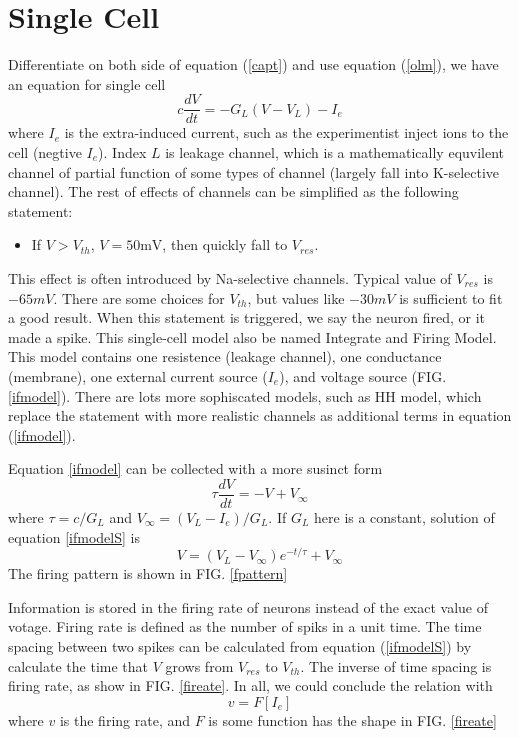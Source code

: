 \documentclass[11pt]{article}
\begin{document}
\section{Single Cell}

Differentiate on both side of equation (\ref{capt}) and use equation ({\ref{olm}}), we
have an equation for single cell
\begin{equation}
  c \frac{dV}{dt} = - G_L (V - V_L) - I_e
  \label{ifmodel}
\end{equation}
where $I_e$ is the extra-induced current, such as the experimentist inject ions
to the cell (negtive $I_e$). Index $L$ is leakage channel, which is a
mathematically equvilent
channel of partial function of some types of channel (largely fall into K-selective channel). The rest of effects of channels can
be simplified as the following statement:
\begin{itemize}
\item{} If $V > V_{th}$, $V = 50 \text{mV}$, then quickly fall to $V_{res}$.
  \label{ifstate}
\end{itemize}
This effect is often introduced by Na-selective channels. Typical value of
$V_{res}$ is $-65 mV$. There are some choices for $V_{th}$, but values like $-30
mV$ is sufficient to fit a good result. When this statement is triggered, we say
the neuron fired, or it made a spike. This single-cell model also be named
Integrate and Firing Model. This model contains one resistence (leakage
channel), one conductance (membrane),
one external current source ($I_e$), and voltage source (FIG. \ref{ifmodel}). There are lots more sophiscated models, such as HH
model, which replace the statement with more realistic channels as
additional terms in equation (\ref{ifmodel}).

Equation \ref{ifmodel} can be collected with a more susinct form
\begin{equation}
  \tau \frac{dV}{dt} = -V + V_{\infty}
  \label{ifmodelS}
\end{equation}
where $\tau = c / G_L$ and $V_{\infty} = (V_L - I_e) / G_L$. If $G_L$ here is
a constant, solution of equation \ref{ifmodelS} is
\begin{equation}
  V = (V_L - V_{\infty}) e^{-t/\tau} + V_{\infty}
\end{equation}
The firing pattern is shown in FIG. \ref{fpattern}

Information is stored in the firing rate of 
neurons instead of the exact value of votage. Firing rate is defined as the
number of spiks in a unit time. The time spacing between two spikes can be
calculated from equation (\ref{ifmodelS}) by calculate the time that $V$ grows
from $V_{res}$ to $V_{th}$. The inverse of time spacing is firing rate, as show
in FIG. \ref{fireate}. In all, we could conclude the relation with
\begin{equation}
  v = F[I_e]
  \label{fireateeq}
\end{equation}
where $v$ is the firing rate, and $F$ is some function has the shape in FIG. \ref{fireate}
\end{document}

